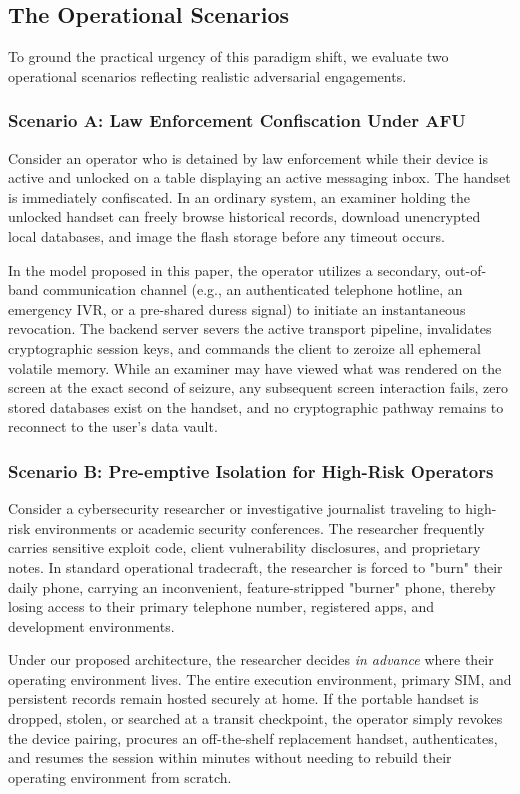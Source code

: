\subsection{The Operational Scenarios}
To ground the practical urgency of this paradigm shift, we evaluate two operational scenarios reflecting realistic adversarial engagements.

\subsubsection{Scenario A: Law Enforcement Confiscation Under AFU}
Consider an operator who is detained by law enforcement while their device is active and unlocked on a table displaying an active messaging inbox. The handset is immediately confiscated. In an ordinary system, an examiner holding the unlocked handset can freely browse historical records, download unencrypted local databases, and image the flash storage before any timeout occurs. 

In the model proposed in this paper, the operator utilizes a secondary, out-of-band communication channel (e.g., an authenticated telephone hotline, an emergency IVR, or a pre-shared duress signal) to initiate an instantaneous revocation. The backend server severs the active transport pipeline, invalidates cryptographic session keys, and commands the client to zeroize all ephemeral volatile memory. While an examiner may have viewed what was rendered on the screen at the exact second of seizure, any subsequent screen interaction fails, zero stored databases exist on the handset, and no cryptographic pathway remains to reconnect to the user's data vault.

\subsubsection{Scenario B: Pre-emptive Isolation for High-Risk Operators}
Consider a cybersecurity researcher or investigative journalist traveling to high-risk environments or academic security conferences. The researcher frequently carries sensitive exploit code, client vulnerability disclosures, and proprietary notes. In standard operational tradecraft, the researcher is forced to "burn" their daily phone, carrying an inconvenient, feature-stripped "burner" phone, thereby losing access to their primary telephone number, registered apps, and development environments.

Under our proposed architecture, the researcher decides \textit{in advance} where their operating environment lives. The entire execution environment, primary SIM, and persistent records remain hosted securely at home. If the portable handset is dropped, stolen, or searched at a transit checkpoint, the operator simply revokes the device pairing, procures an off-the-shelf replacement handset, authenticates, and resumes the session within minutes without needing to rebuild their operating environment from scratch.

